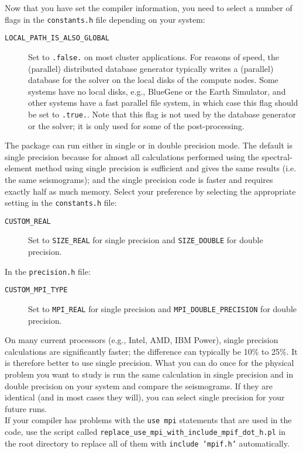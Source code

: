 Now that you have set the compiler information, you need to select
a number of flags in the \texttt{constants.h} file depending on your
system:
\begin{description}
\item [{\texttt{LOCAL\_PATH\_IS\_ALSO\_GLOBAL}}] Set to \texttt{.false.}
on most cluster applications. For reasons of speed, the (parallel)
distributed database generator typically writes a (parallel) database
for the solver on the local disks of the compute nodes. Some systems
have no local disks, e.g., BlueGene or the Earth Simulator, and other
systems have a fast parallel file system, in which case this flag
should be set to \texttt{.true.}. Note that this flag is not used
by the database generator or the solver; it is only used for some
of the post-processing.
\end{description}
The package can run either in single or in double precision mode.
The default is single precision because for almost all calculations
performed using the spectral-element method using single precision
is sufficient and gives the same results (i.e. the same seismograms);
and the single precision code is faster and requires exactly half
as much memory. Select your preference by selecting the appropriate
setting in the \texttt{constants.h} file:
\begin{description}
\item [{\texttt{CUSTOM\_REAL}}] Set to \texttt{SIZE\_REAL} for single precision
and \texttt{SIZE\_DOUBLE} for double precision.
\end{description}
In the \texttt{precision.h} file:
\begin{description}
\item [{\texttt{CUSTOM\_MPI\_TYPE}}] Set to \texttt{MPI\_REAL} for single
precision and \texttt{MPI\_DOUBLE\_PRECISION} for double precision.
\end{description}
On many current processors (e.g., Intel, AMD, IBM Power), single precision
calculations are significantly faster; the difference can typically
be 10\% to 25\%. It is therefore better to use single precision. What
you can do once for the physical problem you want to study is run
the same calculation in single precision and in double precision on
your system and compare the seismograms. If they are identical (and
in most cases they will), you can select single precision for your
future runs.\\

If your compiler has problems with the \texttt{use mpi} statements that are used in the code, use the script called
\texttt{replace\_use\_mpi\_with\_include\_mpif\_dot\_h.pl} in the root directory to replace all of them with \texttt{include 'mpif.h'} automatically.

